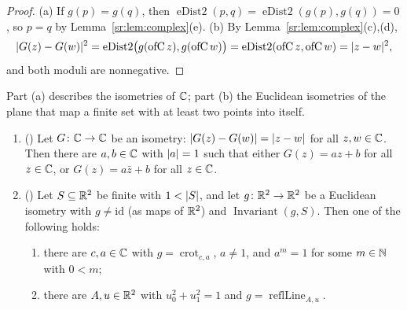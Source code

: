 \begin{proof}
(a) If $g(p)=g(q)$, then $\operatorname{eDist2}(p,q)=\operatorname{eDist2}(g(p),g(q))=0$, so $p=q$ by
Lemma~\ref{sr:lem:complex}(e). (b) By Lemma~\ref{sr:lem:complex}(c),(d),
\[
\lvert G(z)-G(w)\rvert^2=\operatorname{eDist2}\bigl(g(\operatorname{ofC}z),g(\operatorname{ofC}w)\bigr)=
\operatorname{eDist2}(\operatorname{ofC}z,\operatorname{ofC}w)=\lvert z-w\rvert^2,
\]
and both moduli are nonnegative.
\end{proof}

\begin{theorem}\label{sr:thm:structure}
Part (a) describes the isometries of $\mathbb C$; part (b) the Euclidean isometries of the plane that map a finite set with at
least two points into itself.
\begin{enumerate}[label=(\alph*)]
\item () Let $G\colon\mathbb C\to\mathbb C$ be an isometry: $\lvert G(z)-G(w)\rvert=\lvert z-w\rvert$ for all
  $z,w\in\mathbb C$. Then there are $a,b\in\mathbb C$ with $\lvert a\rvert=1$ such that either $G(z)=az+b$ for all $z\in\mathbb C$, or
  $G(z)=a\bar z+b$ for all $z\in\mathbb C$.
\item () Let $S\subseteq\mathbb R^2$ be finite with $1<\lvert S\rvert$, and let $g\colon\mathbb R^2\to\mathbb R^2$ be a
  Euclidean isometry with $g\ne\mathrm{id}$ (as maps of $\mathbb R^2$) and $\operatorname{Invariant}(g,S)$. Then one of the
  following holds:
  \begin{enumerate}[label=(\roman*)]
  \item there are $c,a\in\mathbb C$ with $g=\operatorname{crot}_{c,a}$, $a\ne1$, and $a^m=1$ for some $m\in\mathbb N$ with $0<m$;
  \item there are $A,u\in\mathbb R^2$ with $u_0^2+u_1^2=1$ and $g=\operatorname{reflLine}_{A,u}$.
  \end{enumerate}
\end{enumerate}
\end{theorem}

